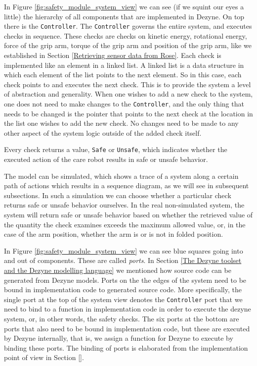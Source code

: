 \documentclass[12pt]{scrreprt}
\begin{document}
In Figure \ref{fig:safety_module_system_view} we can see (if we squint our eyes a little) the hierarchy of all components that are implemented in Dezyne. On top there is the \texttt{Controller}. The \texttt{Controller} governs the entire system, and executes checks in sequence. These checks are checks on kinetic energy, rotational energy, force of the grip arm, torque of the grip arm and position of the grip arm, like we established in Section \ref{Retrieving sensor data from Rose}. Each check is implemented like an element in a linked list. A linked list is a data structure in which each element of the list points to the next element. So in this case, each check points to and executes the next check. This is to provide the system a level of abstraction and generality. When one wishes to add a new check to the system, one does not need to make changes to the \texttt{Controller}, and the only thing that needs to be changed is the pointer that points to the next check at the location in the list one wishes to add the new check. No changes need to be made to any other aspect of the system logic outside of the added check itself.
\par
Every check returns a value, \texttt{Safe} or \texttt{Unsafe}, which indicates whether the executed action of the care robot results in safe or unsafe behavior. 
\par
The model can be simulated, which shows a trace of a system along a certain path of actions which results in a sequence diagram, as we will see in subsequent subsections. In such a simulation we can choose whether a particular check returns safe or unsafe behavior ourselves. In the real non-simulated system, the system will return safe or unsafe behavior based on whether the retrieved value of the quantity the check examines exceeds the maximum allowed value, or, in the case of the arm position, whether the arm is or is not in folded position. 
\par
In Figure \ref{fig:safety_module_system_view} we can see blue squares going into and out of components. These are called \textit{ports}. In Section \ref{The Dezyne toolset and the Dezyne modelling language} we mentioned how source code can be generated from Dezyne models. Ports on the the edges of the system need to be bound in implementation code to generated source code. More specifically, the single port at the top of the system view denotes the \texttt{Controller} port that we need to bind to a function in implementation code in order to execute the dezyne system, or, in other words, the safety checks. The six ports at the bottom are ports that also need to be bound in implementation code, but these are executed by Dezyne internally, that is, we assign a function for Dezyne to execute by binding these ports. The binding of ports is elaborated from the implementation point of view in Section \ref{}.
\end{document}
